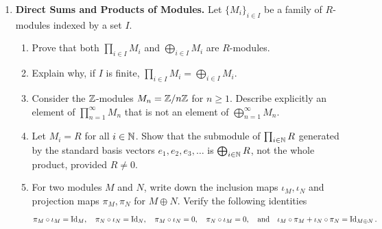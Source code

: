 \documentclass[12pt,reqno]{amsart}
\begin{document}
\begin{enumerate}[leftmargin=*, resume=problems]
\item \textbf{Direct Sums and Products of Modules.} Let $\{M_{i}\}_{i\in I}$ be a family of $R$-modules indexed by a set $I$. 
	\begin{enumerate}
	\item Prove that both $\prod_{i\in I} M_{i}$ and $\bigoplus_{i\in I}M_{i}$ are $R$-modules. 
	\item Explain why, if $I$ is finite, $\prod_{i \in I} M_{i} = \bigoplus_{i \in I} M_i$. 
	\item Consider the $\mathbb{Z}$-modules $M_{n}=\mathbb{Z}/n\mathbb{Z}$ for $n\geq 1$. Describe explicitly an element of $\prod_{n=1}^{\infty}M_{n}$ that is not an
        element of $\bigoplus_{n=1}^{\infty}M_{n}$.
            \item Let $M_i=R$ for all $i\in \mathbb{N}$. Show that the submodule of $\prod_{i\in \mathbb{N}}R$ generated by the standard basis vectors $e_1,e_2,e_3,\ldots$ is $\bigoplus_{i\in \mathbb{N}}R$, not the whole product, provided $R\neq 0$.
    \item For two modules $M$ and $N$, write down the inclusion maps $\iota_M,\iota_N$ and projection maps $\pi_M,\pi_N$ for $M\oplus N$. Verify the following identities
    \[
    \pi_M \circ \iota_M=\operatorname{Id}_M,
    \quad
    \pi_N \circ \iota_N=\operatorname{Id}_N,
    \quad
    \pi_M \circ \iota_N=0,
    \quad
    \pi_N \circ \iota_M=0,
\quad 
    \text{and}
    \quad 
    \iota_M\circ \pi_M+\iota_N\circ \pi_N=\operatorname{Id}_{M\oplus N}.
    \]

        \end{enumerate}


\end{enumerate}
\end{document}
